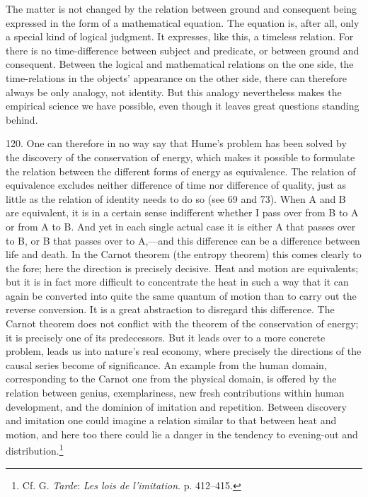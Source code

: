 \documentclass[12pt,a4paper]{book}
\newcommand{\opage}[1]{\marginnote{\footnotesize\textit{[#1]}}}
\begin{document}
The matter is not changed by the relation between ground and consequent being
expressed in the form of a mathematical equation. The equation is, after all,
only a special kind of logical judgment. It expresses, like this, a timeless
relation. For there is no time-difference between subject and predicate, or
between ground and consequent. Between the logical and mathematical relations on
the one side, the time-relations in the objects' appearance on the other side,
there can therefore always be only analogy, not identity. But this analogy
nevertheless makes the empirical science we have possible, even though it leaves
great questions standing behind.

120. One can therefore in no way say that Hume's problem has been solved by the
discovery of the conservation of energy, which makes it possible to formulate
the relation between the different forms of energy as equivalence. The relation
of equivalence excludes neither difference of time nor difference of quality,
just as little as the relation of identity needs to do so (see 69 and 73). When
A and B are equivalent, it is in a certain sense indifferent whether I pass over
from B to A or from A \opage{286}to B. And yet in each single actual case it is either A
that passes over to B, or B that passes over to A,---and this difference can be
a difference between life and death. In the Carnot theorem (the entropy theorem)
this comes clearly to the fore; here the direction is precisely decisive. Heat
and motion are equivalents; but it is in fact more difficult to concentrate the
heat in such a way that it can again be converted into quite the same quantum of
motion than to carry out the reverse conversion. It is a great abstraction to
disregard this difference. The Carnot theorem does not conflict with the theorem
of the conservation of energy; it is precisely one of its predecessors. But it
leads over to a more concrete problem, leads us into nature's real economy,
where precisely the directions of the causal series become of significance. An
example from the human domain, corresponding to the Carnot one from the physical
domain, is offered by the relation between genius, exemplariness, new fresh
contributions within human development, and the dominion of imitation and
repetition. Between discovery and imitation one could imagine a relation similar
to that between heat and motion, and here too there could lie a danger in the
tendency to evening-out and distribution.\footnote{Cf. G. \emph{Tarde}:
\emph{Les lois de l'imitation}. p. 412--415.}
\end{document}
